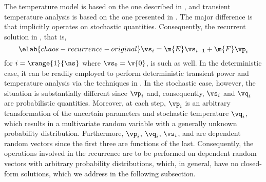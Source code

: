 The temperature model is based on the one described in ,
and transient temperature analysis is based on the one presented in
. The major difference is that
 implicitly operates on stochastic quantities.
Consequently, the recurrent solution in , that
is,
\begin{equation} \elab{chaos-recurrence-original}
  \vs_i = \m{E} \vs_{i - 1} + \m{F} \vp_i
\end{equation}
for $i = \range{1}{\ns}$ where $\vs_0 = \v{0}$, is such as well. In the
deterministic case, it can be readily employed to perform deterministic
transient power and temperature analysis via the techniques in
. In the stochastic case, however, the
situation is substantially different since $\vp_i$ and, consequently, $\vs_i$
and $\vq_i$ are probabilistic quantities. Moreover, at each step, $\vp_i$ is an
arbitrary transformation of the uncertain parameters \vu and stochastic
temperature $\vq_i$, which results in a multivariate random variable with a
generally unknown probability distribution. Furthermore, $\vp_i$, $\vq_i$,
$\vs_i$, and \vu are dependent random vectors since the first three are
functions of the last. Consequently, the operations involved in the recurrence
are to be performed on dependent random vectors with arbitrary probability
distributions, which, in general, have no closed-form solutions, which we
address in the following subsection.

